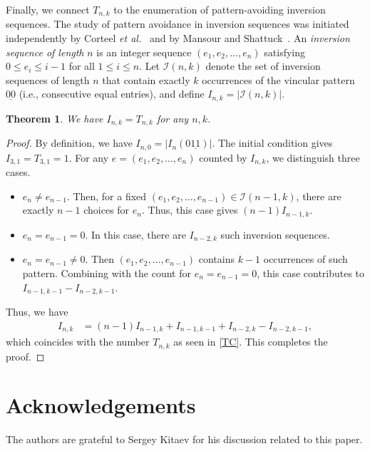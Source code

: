 \documentclass[12pt]{article}
\newtheorem{thm}{Theorem}
\begin{document}
Finally, we connect $T_{n,k}$ to the enumeration of pattern-avoiding inversion sequences. 
The study of pattern avoidance in inversion sequences was initiated independently by Corteel \emph{et al.}~\cite{Corteel2016} and by Mansour and Shattuck~\cite{Mansour2015}.  
An \emph{inversion sequence of length} \( n \) is an integer sequence \( (e_1, e_2, \ldots, e_n) \) satisfying \( 0 \le e_i \le i-1 \) for all \( 1 \le i \le n \).  
Let \( \mathcal{I}(n,k) \) denote the set of inversion sequences of length \( n \) that contain exactly \( k \) occurrences of the vincular pattern \( \underline{00} \) (i.e., consecutive equal entries), and define \( I_{n,k} = |\mathcal{I}(n,k)| \).


\begin{thm}\label{thm-inversion}
 We have $I_{n,k}=T_{n,k}$ for any $n,k$.
\end{thm}
\begin{proof}
 By definition, we have $I_{n,0}=|I_n(0\underline{11})|$. The initial condition gives $I_{3,1}=T_{3,1}=1$. 
For any $e=(e_1,e_2,\ldots,e_n)$ counted by $I_{n,k}$, we distinguish three cases. 
\begin{itemize}
    \item $e_n\neq e_{n-1}$. Then, for a fixed $(e_1, e_2,\ldots, e_{n-1}) \in \mathcal{I}(n-1,k)$, there are exactly $n-1$ choices for $e_n$. Thus, this case gives $(n-1)I_{n-1,k}$. 
    
    \item $e_n= e_{n-1}=0$. In this case, there are $I_{n-2,k}$ such inversion sequences.
    
    \item $e_n= e_{n-1}\neq 0$. Then $(e_1, e_2,\ldots, e_{n-1})$ contains $k-1$ occurrences of such pattern. Combining with the count for $e_n= e_{n-1}=0$, this case contributes to $I_{n-1,k-1}-I_{n-2,k-1}$.
\end{itemize}
Thus, we have
\begin{align}
    I_{n,k}& = (n-1)I_{n-1,k}+I_{n-1,k-1}+I_{n-2,k}-I_{n-2,k-1} \label{I_n,k=T_n,k},
\end{align}
which coincides with the number $T_{n,k}$ as seen in \eqref{TC}. This completes the proof.
\end{proof}

\section*{Acknowledgements} 
The authors are grateful to Sergey Kitaev for his discussion related to this paper. 
\end{document}

